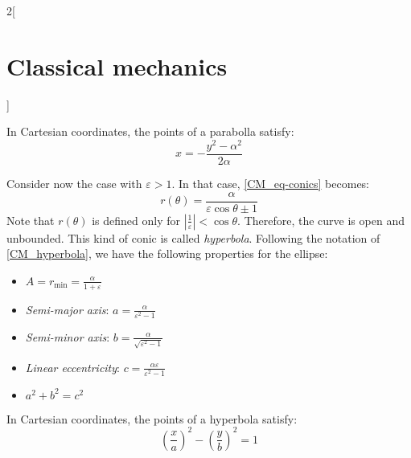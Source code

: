 \documentclass[../../../main_physics.tex]{subfiles}
\begin{document}
\begin{multicols}{2}[\section{Classical mechanics}]
\begin{definition}[Parabolla: $\varepsilon=1$]
    In Cartesian coordinates, the points of a parabolla satisfy: $$x=-\frac{y^2-\alpha^2}{2\alpha}$$
  \end{definition}
  \begin{definition}
    Consider now the case with $\varepsilon>1$. In that case, \cref{CM_eq-conics} becomes: $$r(\theta)=\frac{\alpha}{\varepsilon\cos\theta\pm 1}$$ Note that $r(\theta)$ is defined only for $\left|\frac{1}{\varepsilon}\right|<\cos\theta$. Therefore, the curve is open and unbounded. This kind of conic is called \emph{hyperbola}.
    Following the notation of \cref{CM_hyperbola}, we have the following properties for the ellipse:
    \begin{itemize}
      \item $\displaystyle A=r_\text{min}=\frac{\alpha}{1+\varepsilon}$
      \item \emph{Semi-major axis}: $\displaystyle a=\frac{\alpha}{\varepsilon^2-1}$
      \item \emph{Semi-minor axis}: $\displaystyle b=\frac{\alpha}{\sqrt{\varepsilon^2-1}}$
      \item \emph{Linear eccentricity}: $\displaystyle c=\frac{\alpha\varepsilon}{\varepsilon^2-1}$
      \item $a^2+b^2=c^2$
    \end{itemize}
    \begin{center}
      \begin{minipage}{\linewidth}
        \centering
        
        \label{CM_hyperbola}
      \end{minipage}
    \end{center}
    In Cartesian coordinates, the points of a hyperbola satisfy: $${\left(\frac{x}{a}\right)}^2-{\left(\frac{y}{b}\right)}^2=1$$
  \end{definition}

\end{multicols}
\end{document}
